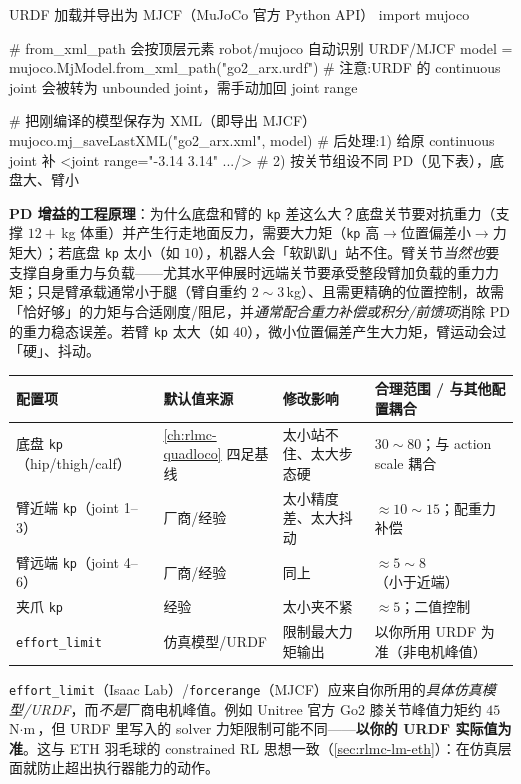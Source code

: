 \begin{codebox}[Python]{URDF 加载并导出为 MJCF（MuJoCo 官方 Python API）}
import mujoco

# from_xml_path 会按顶层元素 robot/mujoco 自动识别 URDF/MJCF
model = mujoco.MjModel.from_xml_path("go2_arx.urdf")
# 注意:URDF 的 continuous joint 会被转为 unbounded joint，需手动加回 joint range

# 把刚编译的模型保存为 XML（即导出 MJCF）
mujoco.mj_saveLastXML("go2_arx.xml", model)
# 后处理:1) 给原 continuous joint 补 <joint range="-3.14 3.14" .../>
#         2) 按关节组设不同 PD（见下表），底盘大、臂小
\end{codebox}

\textbf{PD 增益的工程原理}：为什么底盘和臂的 \verb|kp| 差这么大？底盘关节要对抗重力（支撑 $12+\,$kg 体重）并产生行走地面反力，需要大力矩（\verb|kp| 高$\to$位置偏差小$\to$力矩大）；若底盘 \verb|kp| 太小（如 $10$），机器人会「软趴趴」站不住。臂关节\emph{当然也}要支撑自身重力与负载——尤其水平伸展时远端关节要承受整段臂加负载的重力力矩；只是臂承载通常小于腿（臂自重约 $2\!\sim\!3\,$kg）、且需更精确的位置控制，故需「恰好够」的力矩与合适刚度/阻尼，并\emph{通常配合重力补偿或积分/前馈项}消除 PD 的重力稳态误差。若臂 \verb|kp| 太大（如 $40$），微小位置偏差产生大力矩，臂运动会过「硬」、抖动。

\begin{center}
\small
\begin{tabular}{@{}llll@{}}
\toprule
配置项 & 默认值来源 & 修改影响 & 合理范围 / 与其他配置耦合 \\
\midrule
底盘 \texttt{kp}（hip/thigh/calf） & \cref{ch:rlmc-quadloco} 四足基线 & 太小站不住、太大步态硬 & $30\!\sim\!80$；与 action scale 耦合 \\
臂近端 \texttt{kp}（joint 1--3） & 厂商/经验 & 太小精度差、太大抖动 & $\approx 10\!\sim\!15$；配重力补偿 \\
臂远端 \texttt{kp}（joint 4--6） & 厂商/经验 & 同上 & $\approx 5\!\sim\!8$（小于近端） \\
夹爪 \texttt{kp} & 经验 & 太小夹不紧 & $\approx 5$；二值控制 \\
\texttt{effort\_limit} & 仿真模型/URDF & 限制最大力矩输出 & 以你所用 URDF 为准（非电机峰值） \\
\bottomrule
\end{tabular}
\end{center}

\begin{note}
\verb|effort_limit|（Isaac Lab）/\verb|forcerange|（MJCF）应来自你所用的\emph{具体仿真模型/URDF}，而\emph{不是}厂商电机峰值。例如 Unitree 官方 Go2 膝关节峰值力矩约 $45\,$N$\cdot$m\,\cite{unitree2023go2}，但 URDF 里写入的 solver 力矩限制可能不同——\textbf{以你的 URDF 实际值为准}。这与 ETH 羽毛球的 constrained RL 思想一致（\cref{sec:rlmc-lm-eth}）：在仿真层面就防止超出执行器能力的动作。
\end{note}

